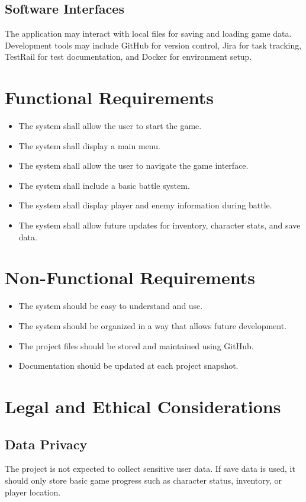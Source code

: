 \documentclass{article}
\begin{document}
\subsection{Software Interfaces}
The application may interact with local files for saving and loading game data. Development tools may include GitHub for version control, Jira for task tracking, TestRail for test documentation, and Docker for environment setup.

\section{Functional Requirements}

\begin{itemize}
    \item The system shall allow the user to start the game.
    \item The system shall display a main menu.
    \item The system shall allow the user to navigate the game interface.
    \item The system shall include a basic battle system.
    \item The system shall display player and enemy information during battle.
    \item The system shall allow future updates for inventory, character stats, and save data.
\end{itemize}

\section{Non-Functional Requirements}

\begin{itemize}
    \item The system should be easy to understand and use.
    \item The system should be organized in a way that allows future development.
    \item The project files should be stored and maintained using GitHub.
    \item Documentation should be updated at each project snapshot.
\end{itemize}

\section{Legal and Ethical Considerations}

\subsection{Data Privacy}
The project is not expected to collect sensitive user data. If save data is used, it should only store basic game progress such as character status, inventory, or player location.
\end{document}
